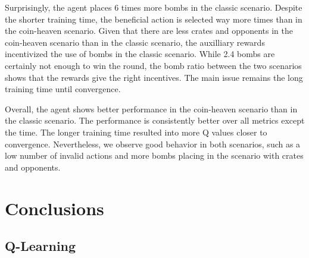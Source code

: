 \documentclass[
	letterpaper, %
	10pt, %
]{CSUniSchoolLabReport}
\begin{document}
Surprisingly, the agent places 6 times more bombs in the classic scenario. Despite the shorter training time,
the beneficial action is selected way more times than in the coin-heaven scenario. Given that there are less
crates and opponents in the coin-heaven scenario than in the classic scenario, the auxilliary rewards incentivized
the use of bombs in the classic scenario. While 2.4 bombs are certainly not enough to win the round,
the bomb ratio between the two scenarios shows that the rewards give the right incentives. The main issue remains
the long training time until convergence.


Overall, the agent shows better performance in the coin-heaven scenario than in
the classic scenario. The performance is consistently better over all metrics except the time.
The longer training time resulted into more Q values closer to convergence. Nevertheless,
we observe good behavior in both scenarios, such as a low number of invalid actions and more bombs placing in
the scenario with crates and opponents.



\section{Conclusions}


\subsection*{Q-Learning}


\printbibliography %

\end{document}
